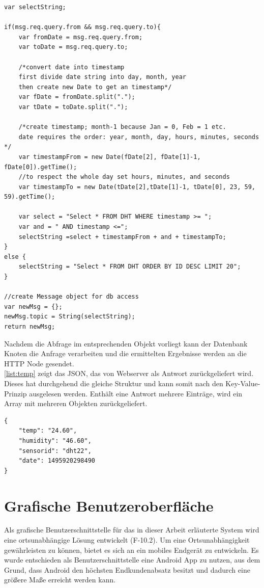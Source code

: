 \begin{lstlisting}[label=list:tempInt, caption={Funktion Node-Red tempInt}]
var selectString;

if(msg.req.query.from && msg.req.query.to){
	var fromDate = msg.req.query.from;
	var toDate = msg.req.query.to;
	
	/*convert date into timestamp
	first divide date string into day, month, year 
	then create new Date to get an timestamp*/
	var fDate = fromDate.split("."); 
	var tDate = toDate.split(".");
	
	/*create timestamp; month-1 because Jan = 0, Feb = 1 etc.
	date requires the order: year, month, day, hours, minutes, seconds */
	var timestampFrom = new Date(fDate[2], fDate[1]-1, fDate[0]).getTime();
	//to respect the whole day set hours, minutes, and seconds
	var timestampTo = new Date(tDate[2],tDate[1]-1, tDate[0], 23, 59, 59).getTime();
	
	var select = "Select * FROM DHT WHERE timestamp >= "; 
	var and = " AND timestamp <=";
	selectString =select + timestampFrom + and + timestampTo;
}
else {
	selectString = "Select * FROM DHT ORDER BY ID DESC LIMIT 20";
}

//create Message object for db access
var newMsg = {};
newMsg.topic = String(selectString);
return newMsg;
\end{lstlisting}

Nachdem die Abfrage im entsprechenden Objekt vorliegt kann der Datenbank Knoten die Anfrage verarbeiten und die ermittelten Ergebnisse werden an die \ac{HTTP} Node gesendet.
\\\autoref{list:temp}  zeigt das \ac{JSON}, das von Webserver als Antwort zurückgeliefert wird. Dieses hat durchgehend die gleiche Struktur und kann somit nach den Key-Value-Prinzip ausgelesen werden. Enthält eine Antwort mehrere Einträge, wird ein Array mit mehreren Objekten zurückgeliefert.
\begin{lstlisting}[label=list:temp, caption={JSON Response /temp}]
{
	"temp": "24.60",
	"humidity": "46.60",
	"sensorid": "dht22",
	"date": 1495920298490
}
\end{lstlisting}

\section{Grafische Benutzeroberfläche}
Als grafische Benutzerschnittstelle für das in dieser Arbeit erläuterte System wird eine ortsunabhängige Lösung entwickelt (F-10.2). Um eine Ortsunabhängigkeit gewährleisten zu können, bietet es sich an ein mobiles Endgerät zu entwickeln. Es wurde  entschieden als Benutzerschnittstelle eine Android App zu nutzen, aus dem Grund, dass Android den höchsten Endkundenabsatz besitzt \cite{statista:marktanteileandroid} und dadurch eine größere Maße erreicht werden kann.
